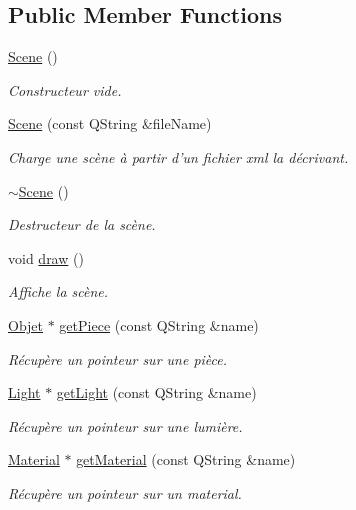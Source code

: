 \subsection*{Public Member Functions}
\begin{DoxyCompactItemize}
\item 
\hyperlink{class_scene_ad10176d75a9cc0da56626f682d083507}{Scene} ()
\begin{DoxyCompactList}\small\item\em Constructeur vide. \end{DoxyCompactList}\item 
\hyperlink{class_scene_a31c9409af2f7f8f592519eb4a3029624}{Scene} (const Q\+String \&file\+Name)
\begin{DoxyCompactList}\small\item\em Charge une scène à partir d'un fichier xml la décrivant. \end{DoxyCompactList}\item 
\hyperlink{class_scene_a3b8cec2e32546713915f8c6303c951f1}{$\sim$\+Scene} ()
\begin{DoxyCompactList}\small\item\em Destructeur de la scène. \end{DoxyCompactList}\item 
void \hyperlink{class_scene_ac0e3d2c98ba6063a086467fb2c19142f}{draw} ()
\begin{DoxyCompactList}\small\item\em Affiche la scène. \end{DoxyCompactList}\item 
\hyperlink{class_objet}{Objet} $\ast$ \hyperlink{class_scene_a9b9010182265cbbd1870fd45a4759d0f}{get\+Piece} (const Q\+String \&name)
\begin{DoxyCompactList}\small\item\em Récupère un pointeur sur une pièce. \end{DoxyCompactList}\item 
\hyperlink{class_light}{Light} $\ast$ \hyperlink{class_scene_ae75e1e0573b52c2c960e8afe77fead94}{get\+Light} (const Q\+String \&name)
\begin{DoxyCompactList}\small\item\em Récupère un pointeur sur une lumière. \end{DoxyCompactList}\item 
\hyperlink{class_material}{Material} $\ast$ \hyperlink{class_scene_a6c54f74841e986a80b03866dbed21d33}{get\+Material} (const Q\+String \&name)
\begin{DoxyCompactList}\small\item\em Récupère un pointeur sur un material. \end{DoxyCompactList}\item 

\end{DoxyCompactItemize}
